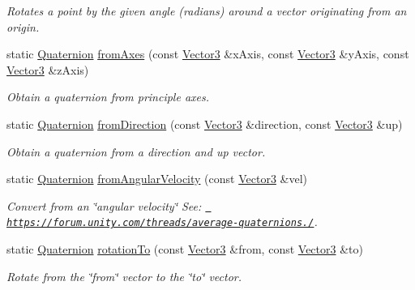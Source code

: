 \begin{DoxyCompactItemize}
\begin{DoxyCompactList}\small\item\em Rotates a point by the given angle (radians) around a vector originating from an origin. \end{DoxyCompactList}\item 
static \mbox{\hyperlink{classrev_1_1_quaternion}{Quaternion}} \mbox{\hyperlink{classrev_1_1_quaternion_abfe160e55cb0a142af8fec5afc038188}{from\+Axes}} (const \mbox{\hyperlink{classrev_1_1_vector}{Vector3}} \&x\+Axis, const \mbox{\hyperlink{classrev_1_1_vector}{Vector3}} \&y\+Axis, const \mbox{\hyperlink{classrev_1_1_vector}{Vector3}} \&z\+Axis)
\begin{DoxyCompactList}\small\item\em Obtain a quaternion from principle axes. \end{DoxyCompactList}\item 
static \mbox{\hyperlink{classrev_1_1_quaternion}{Quaternion}} \mbox{\hyperlink{classrev_1_1_quaternion_a1f172fc581c685701a8a731a5182cc1c}{from\+Direction}} (const \mbox{\hyperlink{classrev_1_1_vector}{Vector3}} \&direction, const \mbox{\hyperlink{classrev_1_1_vector}{Vector3}} \&up)
\begin{DoxyCompactList}\small\item\em Obtain a quaternion from a direction and up vector. \end{DoxyCompactList}\item 
\mbox{\label{classrev_1_1_quaternion_a36a0ae365b9a1460668ab9fa6d1cab4d}} 
static \mbox{\hyperlink{classrev_1_1_quaternion}{Quaternion}} \mbox{\hyperlink{classrev_1_1_quaternion_a36a0ae365b9a1460668ab9fa6d1cab4d}{from\+Angular\+Velocity}} (const \mbox{\hyperlink{classrev_1_1_vector}{Vector3}} \&vel)
\begin{DoxyCompactList}\small\item\em Convert from an \char`\"{}angular velocity\char`\"{} See\+: \href{https://forum.unity.com/threads/average-quaternions.86898/}{\texttt{ https\+://forum.\+unity.\+com/threads/average-\/quaternions./}}. \end{DoxyCompactList}\item 
static \mbox{\hyperlink{classrev_1_1_quaternion}{Quaternion}} \mbox{\hyperlink{classrev_1_1_quaternion_ab62c7a0d6e6254c18bf5f61801e1755b}{rotation\+To}} (const \mbox{\hyperlink{classrev_1_1_vector}{Vector3}} \&from, const \mbox{\hyperlink{classrev_1_1_vector}{Vector3}} \&to)
\begin{DoxyCompactList}\small\item\em Rotate from the \char`\"{}from\char`\"{} vector to the \char`\"{}to\char`\"{} vector. \end{DoxyCompactList}\item 

\end{DoxyCompactItemize}
